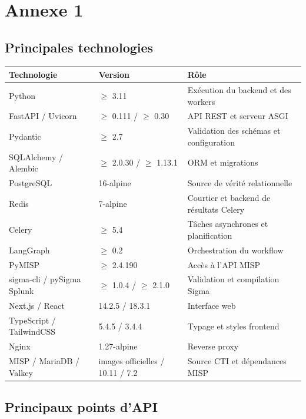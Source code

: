 \chapter*{Annexe 1}

\section*{Principales technologies}

\begin{longtable}{|p{}|p{}|p{}|}
\hline
\rowcolor[gray]{0.8}\textbf{Technologie} & \textbf{Version} & \textbf{Rôle} \\
\hline
Python & $\geq$ 3.11 & Exécution du backend et des workers \\
\hline
FastAPI / Uvicorn & $\geq$ 0.111 / $\geq$ 0.30 & API REST et serveur ASGI \\
\hline
Pydantic & $\geq$ 2.7 & Validation des schémas et configuration \\
\hline
SQLAlchemy / Alembic & $\geq$ 2.0.30 / $\geq$ 1.13.1 & ORM et migrations \\
\hline
PostgreSQL & 16-alpine & Source de vérité relationnelle \\
\hline
Redis & 7-alpine & Courtier et backend de résultats Celery \\
\hline
Celery & $\geq$ 5.4 & Tâches asynchrones et planification \\
\hline
LangGraph & $\geq$ 0.2 & Orchestration du workflow \\
\hline
PyMISP & $\geq$ 2.4.190 & Accès à l'API MISP \\
\hline
sigma-cli / pySigma Splunk & $\geq$ 1.0.4 / $\geq$ 2.1.0 & Validation et compilation Sigma \\
\hline
Next.js / React & 14.2.5 / 18.3.1 & Interface web \\
\hline
TypeScript / TailwindCSS & 5.4.5 / 3.4.4 & Typage et styles frontend \\
\hline
Nginx & 1.27-alpine & Reverse proxy \\
\hline
MISP / MariaDB / Valkey & images officielles / 10.11 / 7.2 & Source CTI et dépendances MISP \\
\hline
\end{longtable}

\section*{Principaux points d'API}

